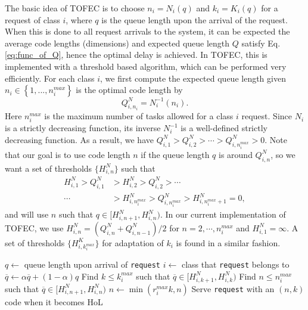 \documentclass[journal]{IEEEtran}
\newcommand{\ourproposal}{TOFEC\xspace}
\newcommand{\nthreshold}{H^{N}}
\newcommand{\kthreshold}{H^{K}}
\begin{document}
The basic idea of \ourproposal is to choose $n_i = N_i(q)$ and $k_i= K_i(q)$ for a request of class $i$, where $q$ is the queue length upon the arrival of the request. When this is done to all request arrivals to the system, it can be expected the average code lengths (dimensions) and expected queue length $Q$ satisfy Eq.\ref{eq:func_of_Q}, hence the optimal delay is achieved.  In \ourproposal, this is implemented with a threshold based algorithm, which can be performed very efficiently. 
For each class $i$, we first compute the expected queue length given $n_i \in \left\{1,...,n_i^{max}\right\}$ is the optimal code length by
\begin{equation}
Q^{N}_{i,n_i} = N_i^{-1}(n_i).
\end{equation}
Here $n_i^{max}$ is the maximum number of tasks allowed for a class $i$ request. Since $N_i$ is a strictly decreasing function, its inverse $N_i^{-1}$ is a well-defined strictly decreasing function. As a result, we have
$ Q^{N}_{i,1} > Q^{N}_{i,2} > \cdots > Q^{N}_{i,n_i^{max}} >0.$
Note that our goal is to use code length $n$ if the queue length $q$ is around $Q^{N}_{i,n}$, so we want a set of thresholds $\{\nthreshold_{i,n}\}$ such that
\begin{align*} 
\nthreshold_{i,1}> Q^{N}_{i,1} &>\nthreshold_{i,2} > Q^{N}_{i,2} > \cdots \\
\cdots &> \nthreshold_{i,n_i^{max}} > Q^{N}_{i,n_i^{max}} > \nthreshold_{i,n_i^{max}+1}=0,
\end{align*}
and will use $n$ such that $q\in[\nthreshold_{i,n+1},\nthreshold_{i,n})$.
In our current implementation of \ourproposal, we use
$ \nthreshold_{i,n} = \left(Q^{N}_{i,n} + Q^{N}_{i,n-1}\right)/2$
for  $n = 2,\cdots, n_i^{max}$ and $\nthreshold_{i,1} = \infty$.
A set of thresholds $\{\kthreshold_{i,k_i^{max}}\}$ for adaptation of $k_i$ is found in a similar fashion.






\begin{algorithm}[t]
	$q \leftarrow $ queue length upon arrival of {\tt request}\;
	$i\leftarrow$ class that {\tt request} belongs to\;
	$\overline{q} \leftarrow \alpha \overline{q} + (1-\alpha)q$\;
	Find $k\le k_i^{max}$ such that $\overline{q}\in [\nthreshold_{i,k+1},\nthreshold_{i,k})$\;
	Find $n\le n_i^{max}$ such that $\overline{q}\in [\nthreshold_{i,n+1},\nthreshold_{i,n})$\;
	$n \leftarrow \min(r_i^{max}k, n)$\;	\label{step:double-check-n}
	Serve {\tt request} with an $(n,k)$ code when it becomes HoL\;
	\caption{\ourproposal (Throughput Optimal FEC Cloud)}
	\label{alg:TOFEC}
\end{algorithm}
\end{document}
